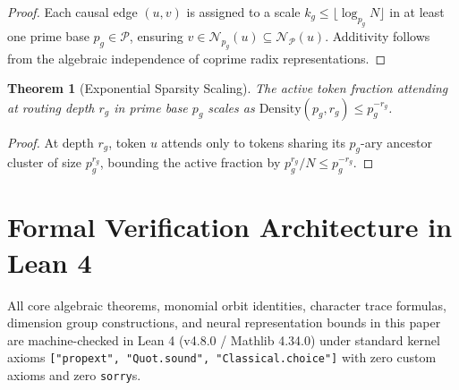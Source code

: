 \documentclass[11pt,reqno]{article}
\theoremstyle{plain}
\newtheorem{theorem}{Theorem}[section]
\theoremstyle{definition}
\theoremstyle{remark}
\newcommand{\Density}{\mathrm{Density}}
\begin{document}
\begin{proof}
Each causal edge $(u, v)$ is assigned to a scale $k_g \le \lfloor \log_{p_g} N \rfloor$ in at least one prime base $p_g \in \mathcal{P}$, ensuring $v \in \mathcal{N}_{p_g}(u) \subseteq \mathcal{N}_{\mathcal{P}}(u)$. Additivity follows from the algebraic independence of coprime radix representations.
\end{proof}

\begin{theorem}[Exponential Sparsity Scaling]
\label{thm:sparsity_scaling}
The active token fraction attending at routing depth $r_g$ in prime base $p_g$ scales as $\Density(p_g, r_g) \le p_g^{-r_g}$.
\end{theorem}

\begin{proof}
At depth $r_g$, token $u$ attends only to tokens sharing its $p_g$-ary ancestor cluster of size $p_g^{r_g}$, bounding the active fraction by $p_g^{r_g} / N \le p_g^{-r_g}$.
\end{proof}

\section{Formal Verification Architecture in Lean 4}

All core algebraic theorems, monomial orbit identities, character trace formulas, dimension group constructions, and neural representation bounds in this paper are machine-checked in Lean 4 (v4.8.0 / Mathlib 4.34.0) under standard kernel axioms \texttt{["propext", "Quot.sound", "Classical.choice"]} with zero custom axioms and zero \texttt{sorry}s.
\end{document}
